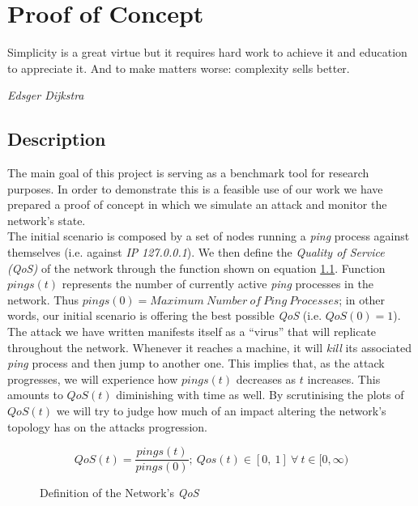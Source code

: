 \chapter{Proof of Concept} \label{chap:5}
    \epigraph{Simplicity is a great virtue but it requires hard work to achieve it and education to appreciate it.
        And to make matters worse: complexity sells better.}{\textit{Edsger Dijkstra}}

    \section{Description}
        The main goal of this project is serving as a benchmark tool for research purposes. In order to demonstrate this is a feasible use of our work we have prepared a proof of concept in which we simulate an attack and monitor the network's state.\\

        The initial scenario is composed by a set of nodes running a \textit{ping} process against themselves (i.e. against \textit{IP} \textit{127.0.0.1}). We then define the \textit{Quality of Service (QoS)} of the network through the function shown on equation \ref{eq:net-qos}. Function $pings(t)$ represents the number of currently active \textit{ping} processes in the network. Thus $pings(0) = Maximum\ Number\ of\ Ping\ Processes$; in other words, our initial scenario is offering the best possible \textit{QoS} (i.e. $QoS(0) = 1$).\\

        The attack we have written manifests itself as a ``virus'' that will replicate throughout the network. Whenever it reaches a machine, it will \textit{kill} its associated \textit{ping} process and then jump to another one. This implies that, as the attack progresses, we will experience how $pings(t)$ decreases as $t$ increases. This amounts to $QoS(t)$ diminishing with time as well. By scrutinising the plots of $QoS( t )$ we will try to judge how much of an impact altering the network's topology has on the attacks progression.\\

        {
            \renewcommand\figurename{Equation}
            \begin{figure}
                $$QoS(t) = \frac{pings(t)}{pings(0)};\ Qos(t) \in [0,\ 1]\ \forall\ t \in [0, \infty)$$
                \caption{Definition of the Network's \textit{QoS}}
                \label{eq:net-qos}
            \end{figure}
        }

